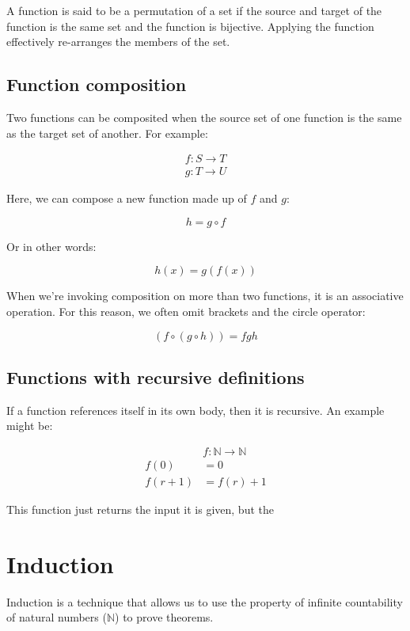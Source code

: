 A function is said to be a permutation of a set if the source and target of the
function is the same set and the function is bijective. Applying the function
effectively re-arranges the members of the set.

\subsection{Function composition}

Two functions can be composited when the source set of one function is the same
as the target set of another. For example:

\[
	\begin{split}
		f:S \rightarrow T\\
		g:T \rightarrow U
	\end{split}
\]

Here, we can compose a new function made up of $f$ and $g$:

\[
	h = g \circ f
\]

Or in other words:

\[
	h(x) = g(f(x))
\]

When we're invoking composition on more than two functions, it is an associative
operation. For this reason, we often omit brackets and the circle operator:

\[
	(f \circ (g \circ h)) = fgh
\]

\subsection*{Functions with recursive definitions}

If a function references itself in its own body, then it is recursive. An
example might be:

\[
	\begin{split}
		&f:\mathbb{N} \rightarrow \mathbb{N}\\
		f(0) &= 0\\
		f(r + 1) &= f(r) + 1
	\end{split}
\]

This function just returns the input it is given, but the 

\section{Induction}

Induction is a technique that allows us to use the property of infinite
countability of natural numbers ($\mathbb{N}$) to prove theorems.

